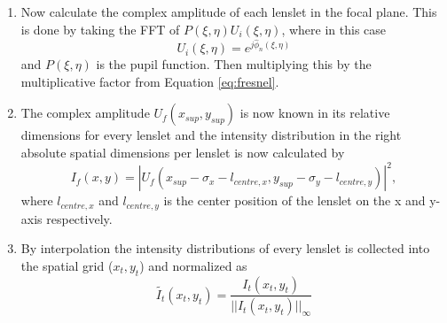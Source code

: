 \begin{enumerate}
	\item
	Now calculate the complex amplitude of each lenslet in the focal plane. This is done by taking the FFT of $P(\xi,\eta)U_i(\xi,\eta)$, where in this case
	\begin{equation}
	U_i(\xi,\eta) = e^{j\hat{\phi}_n(\xi,\eta)}
	\end{equation}
	and $P(\xi,\eta)$ is the pupil function. Then multiplying this by the multiplicative factor from Equation \eqref{eq:fresnel}.
	\item 
	The complex amplitude $U_f(x_{sup},y_{sup})$ is now known in its relative dimensions for every lenslet and the intensity distribution in the right absolute spatial dimensions per lenslet is now calculated by 
	\begin{equation}
	I_f(x,y)=|U_f(x_{sup} - \sigma_x - l_{centre,x},y_{sup} - \sigma_y - l_{centre,y})|^2,
	\end{equation}
	where $l_{centre,x}$ and $l_{centre,y}$ is the center position of the lenslet on the x and y-axis respectively.  
	\item 
	By interpolation the intensity distributions of every lenslet is collected into the spatial grid ($x_t,y_t$) and normalized as
	\begin{equation}
	\tilde{I_t}(x_t,y_t) = \frac{I_t(x_t,y_t)}{||I_t(x_t,y_t)||_\infty}
	\end{equation}
	
\end{enumerate}


